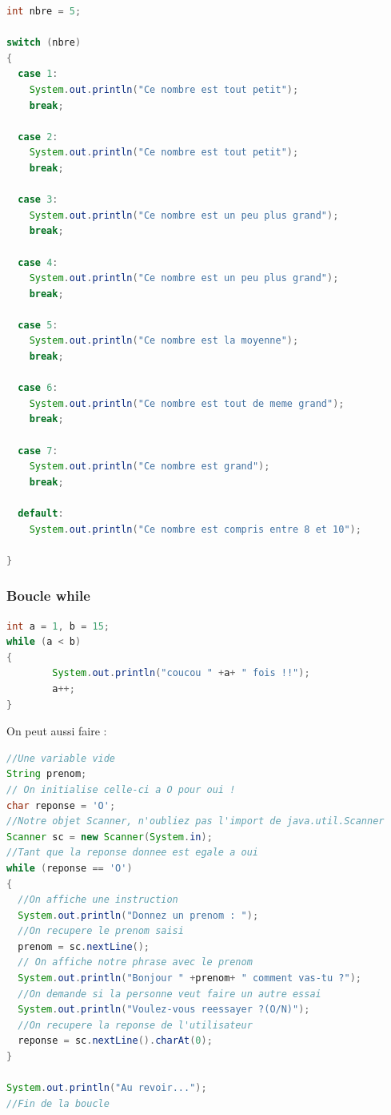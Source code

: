 \documentclass[a4paper,twoside]{article}
\begin{document}
\begin{lstlisting}[language=java]
int nbre = 5; 

switch (nbre)
{
  case 1: 
    System.out.println("Ce nombre est tout petit");
    break;

  case 2: 
    System.out.println("Ce nombre est tout petit");
    break;

  case 3: 
    System.out.println("Ce nombre est un peu plus grand");
    break;

  case 4: 
    System.out.println("Ce nombre est un peu plus grand");
    break;

  case 5: 
    System.out.println("Ce nombre est la moyenne");
    break;

  case 6: 
    System.out.println("Ce nombre est tout de meme grand");
    break;

  case 7: 
    System.out.println("Ce nombre est grand");
    break;

  default: 
    System.out.println("Ce nombre est compris entre 8 et 10");

}
\end{lstlisting}

\subsubsection{Boucle while}
\begin{lstlisting}[language=java]
int a = 1, b = 15;
while (a < b)
{
        System.out.println("coucou " +a+ " fois !!");
        a++;
}
\end{lstlisting}

On peut aussi faire :
\begin{lstlisting}[language=java]
//Une variable vide
String prenom;
// On initialise celle-ci a O pour oui !
char reponse = 'O';
//Notre objet Scanner, n'oubliez pas l'import de java.util.Scanner
Scanner sc = new Scanner(System.in);
//Tant que la reponse donnee est egale a oui
while (reponse == 'O')
{
  //On affiche une instruction
  System.out.println("Donnez un prenom : ");
  //On recupere le prenom saisi
  prenom = sc.nextLine();
  // On affiche notre phrase avec le prenom
  System.out.println("Bonjour " +prenom+ " comment vas-tu ?");
  //On demande si la personne veut faire un autre essai
  System.out.println("Voulez-vous reessayer ?(O/N)");
  //On recupere la reponse de l'utilisateur
  reponse = sc.nextLine().charAt(0);
}
 
System.out.println("Au revoir...");
//Fin de la boucle
\end{lstlisting}
\end{document}
